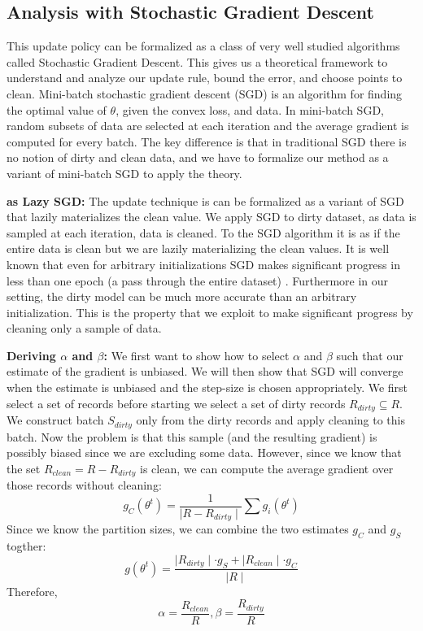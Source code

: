 \subsection{Analysis with Stochastic Gradient Descent}\label{sgd}
This update policy can be formalized as a class of very well studied algorithms called Stochastic Gradient Descent.
This gives us a theoretical framework to understand and analyze our update rule, bound the error, and choose points to clean.
Mini-batch stochastic gradient descent (SGD) is an algorithm for finding the optimal value
of $\theta$, given the convex loss, and data.
In mini-batch SGD, random subsets of data are selected at each iteration and the average gradient is computed for every batch.
The key difference is that in traditional SGD there is no notion of dirty and clean data, and we have to formalize our method as a variant of mini-batch SGD to apply the theory.

\vspace{0.5em}

\noindent\textbf{ \sys as Lazy SGD: } The update technique is \sys can be formalized as a variant of SGD that lazily materializes the clean value.
We apply SGD to dirty dataset, as data is sampled at each iteration, data is cleaned.
To the SGD algorithm it is as if the entire data is clean but we are lazily materializing the clean values.
It is well known that even for arbitrary initializations SGD makes significant progress in less than one epoch (a pass through the entire dataset) \cite{bottou2012stochastic}.
Furthermore in our setting, the dirty model can be much more accurate than an arbitrary initialization.
This is the property that we exploit to make significant progress by cleaning only a sample of data.

\vspace{0.5em}

\noindent\textbf{Deriving $\alpha$ and $\beta$: } We first want to show how to select $\alpha$ and $\beta$ such that our estimate of the gradient is unbiased. 
We will then show that SGD will converge when the estimate is unbiased and the step-size is chosen appropriately.
We first select a set of records before starting we select a set of dirty records $R_{dirty} \subseteq R$. 
We construct batch $S_{dirty}$ only from the dirty records and apply cleaning to this batch.
Now the problem is that this sample (and the resulting gradient) is possibly biased since we are excluding some data.
However, since we know that the set $R_{clean} = R - R_{dirty}$ is clean, we can compute the average gradient over those records without cleaning:
\[
g_C(\theta^{t}) = \frac{1}{\mid R - R_{dirty} \mid} \sum g_i(\theta^{t})
\]
Since we know the partition sizes, we can combine the two estimates $g_C$ and $g_S$ togther:
\[
g(\theta^{t}) = \frac{\mid R_{dirty} \mid \cdot g_S + \mid R_{clean} \mid \cdot g_C  }{\mid R \mid}
\]
Therefore,
\[
\alpha = \frac{R_{clean}}{R}, \beta = \frac{R_{dirty}}{R}
\]

